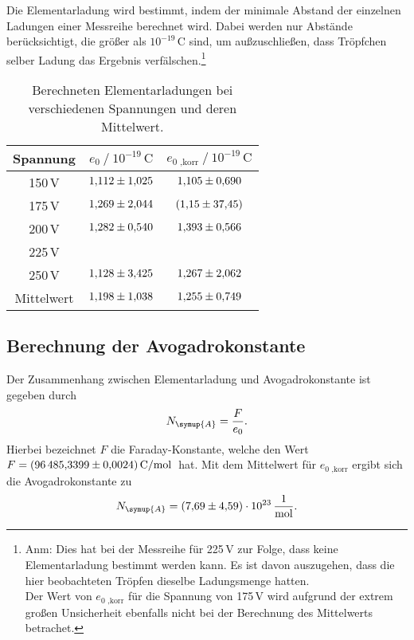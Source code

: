 Die Elementarladung wird bestimmt, indem der minimale Abstand der einzelnen Ladungen einer Messreihe berechnet wird. Dabei 
werden nur Abstände berücksichtigt, die größer als $10^{-19}\,\unit{\coulomb}$ sind, um außzuschließen, dass Tröpfchen selber
Ladung das Ergebnis verfälschen.\footnote{Anm: Dies hat bei der Messreihe für 225\,V zur Folge, dass keine Elementarladung
bestimmt werden kann. Es ist davon auszugehen, dass die hier beobachteten Tröpfen dieselbe Ladungsmenge hatten. \\Der Wert von 
$e_{0\text{ ,korr}}$ für die Spannung von 175\,V wird aufgrund der extrem großen Unsicherheit ebenfalls nicht bei der Berechnung 
des Mittelwerts betrachet.}
\begin{table}[H]
    \centering
    \caption{Berechneten Elementarladungen bei verschiedenen Spannungen und deren Mittelwert.}
    \label{tab:e_0}
    \begin{tabular}{S S S}
        \toprule
        {Spannung} & {$e_0 \mathbin{/} 10^{-19}\,\unit{\coulomb}$} %
        & {$e_{0\text{ ,korr}} \mathbin{/} 10^{-19}\,\unit{\coulomb}$}\\
        \midrule
        {150\,V} & $\num{1.112+-1.025}$ & $\num{1.105+-0.690}$ \\
        {175\,V} & $\num{1.269+-2.044}$ & {$(\num{1.15+-37.45})$} \\
        {200\,V} & $\num{1.282+-0.540}$ & $\num{1.393+-0.566}$ \\
        {225\,V} & {}                   & {}                   \\
        {250\,V} & $\num{1.128+-3.425}$ & $\num{1.267+-2.062}$ \\
        \midrule
        {Mittelwert} & $\num{1.198+-1.038}$ & $\num{1.255+-0.749}$ \\
        \bottomrule
    \end{tabular}
  \end{table}
  
  \subsection{Berechnung der Avogadrokonstante}
  Der Zusammenhang zwischen Elementarladung und Avogadrokonstante ist gegeben durch
  \begin{equation*}
      N_{\symup{A}} = \frac{F}{e_0}.
  \end{equation*}
Hierbei bezeichnet $F$ die Faraday-Konstante, welche den Wert $F=\qty{96485,3399 +- 0,0024}{\coulomb\per\mol}$\,\cite{czichos} hat.
Mit dem Mittelwert für $e_{0\text{ ,korr}}$ ergibt sich die Avogadrokonstante zu
\begin{equation*}
    N_{\symup{A}} = \qty{7.69(4.59)e23}{\per\mol}.
\end{equation*}



